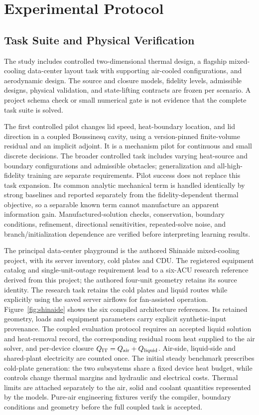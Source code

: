 \section{Experimental Protocol}
\subsection{Task Suite and Physical Verification}
The study includes controlled two-dimensional thermal design, a flagship mixed-cooling data-center layout task with supporting air-cooled configurations, and aerodynamic design. The source and closure models, fidelity levels, admissible designs, physical validation, and state-lifting contracts are frozen per scenario. A project schema check or small numerical gate is not evidence that the complete task suite is solved.

The first controlled pilot changes lid speed, heat-boundary location, and lid direction in a coupled Boussinesq cavity, using a version-pinned finite-volume residual and an implicit adjoint. It is a mechanism pilot for continuous and small discrete decisions. The broader controlled task includes varying heat-source and boundary configurations and admissible obstacles; generalization and all-high-fidelity training are separate requirements. Pilot success does not replace this task expansion. Its common analytic mechanical term is handled identically by strong baselines and reported separately from the fidelity-dependent thermal objective, so a separable known term cannot manufacture an apparent information gain. Manufactured-solution checks, conservation, boundary conditions, refinement, directional sensitivities, repeated-solve noise, and branch/initialization dependence are verified before interpreting learning results.

The principal data-center playground is the authored Shinaide mixed-cooling project, with its server inventory, cold plates and CDU. The registered equipment catalog and single-unit-outage requirement lead to a six-ACU research reference derived from this project; the authored four-unit geometry retains its source identity. The research task retains the cold plates and liquid routes while explicitly using the saved server airflows for fan-assisted operation. Figure~\ref{fig:shinaide} shows the six compiled architecture references. Its retained geometry, loads and equipment parameters carry explicit synthetic-input provenance. The coupled evaluation protocol requires an accepted liquid solution and heat-removal record, the corresponding residual room heat supplied to the air solver, and per-device closure $Q_{\rm IT}=Q_{\rm air}+Q_{\rm liquid}$. Air-side, liquid-side and shared-plant electricity are counted once. The initial steady benchmark prescribes cold-plate generation: the two subsystems share a fixed device heat budget, while controls change thermal margins and hydraulic and electrical costs. Thermal limits are attached separately to the air, solid and coolant quantities represented by the models. Pure-air engineering fixtures verify the compiler, boundary conditions and geometry before the full coupled task is accepted.

